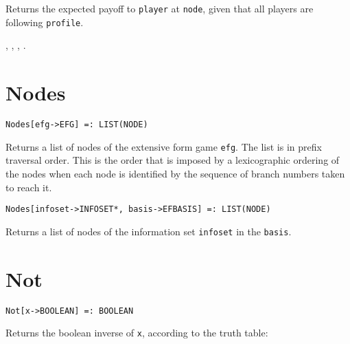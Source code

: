 \noindent
Returns the expected payoff to \verb+player+ at \verb+node+, given
that all players are following \verb+profile+.

\seealso
{},
,
,
. 


\section*{Nodes}\label{PrimNodes}
\begin{verbatim}
Nodes[efg->EFG] =: LIST(NODE) 
\end{verbatim}

\noindent
Returns a list of nodes of the extensive form game \verb+efg+.  The
list is in prefix traversal order.  This is the order that is
imposed by a lexicographic ordering of the nodes when each node is
identified by the sequence of branch numbers taken to reach it.  

\newsignature

\begin{verbatim}
Nodes[infoset->INFOSET*, basis->EFBASIS] =: LIST(NODE) 
\end{verbatim}

\noindent
Returns a list of nodes of the information set \verb+infoset+ in the
\verb+basis+.  


\section*{Not}\label{PrimNot}
\begin{verbatim}
Not[x->BOOLEAN] =: BOOLEAN 
\end{verbatim}

\noindent
Returns the boolean inverse of \verb+x+, according to the truth table:


